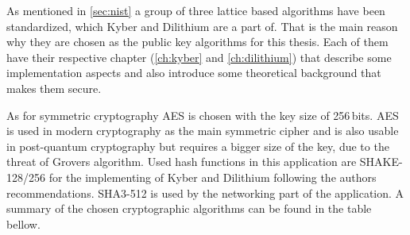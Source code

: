 As mentioned in \ref{sec:nist} a group of three lattice based algorithms have been standardized, which Kyber and Dilithium are a part of. That is the main reason why they are chosen as the public key algorithms for this thesis. Each of them have their respective chapter (\ref{ch:kyber} and \ref{ch:dilithium}) that describe some implementation aspects and also introduce some theoretical background that makes them secure.

As for symmetric cryptography AES is chosen with the key size of 256\,bits. AES is used in modern cryptography as the main symmetric cipher and is also usable in post-quantum cryptography but requires a bigger size of the key, due to the threat of Grovers algorithm. Used hash functions in this application are SHAKE-128/256 for the implementing of Kyber and Dilithium following the authors recommendations. SHA3-512 is used by the networking part of the application. A summary of the chosen cryptographic algorithms can be found in the table bellow.


